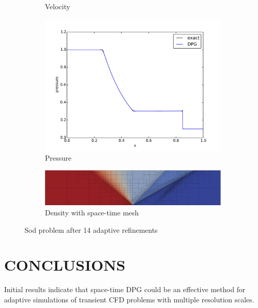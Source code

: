 \documentclass{parcfd2014}
\begin{document}
\begin{figure}[h]
\begin{subfigure}[c]{0.3\textwidth}
\caption{Velocity}
\label{fig:sod_vel14}
\end{subfigure}
\begin{subfigure}[c]{0.3\textwidth}
\centering
\includegraphics[width=\textwidth]{figs/Sod1e-5/pres15.pdf}
\caption{Pressure}
\label{fig:sod_pres14}
\end{subfigure}
\begin{subfigure}[c]{0.9\textwidth}
\centering
\includegraphics[width=\textwidth]{figs/Sod1e-5/mesh15.png}
\caption{Density with space-time mesh}
\label{fig:sod_mesh14}
\end{subfigure}
\caption{Sod problem after 14 adaptive refinements}
\label{fig:sod}
\end{figure}


\section{CONCLUSIONS}
Initial results indicate that space-time DPG could be an effective method for adaptive simulations of transient CFD problems with multiple resolution scales.

\end{document}
